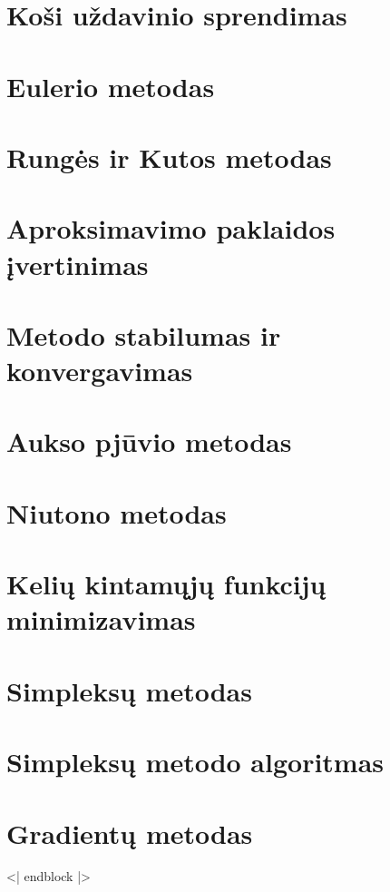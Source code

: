 \cite[9-42]{textbook-differential-equations}
\section{Koši uždavinio sprendimas}
\section{Eulerio metodas}
\section{Rungės ir Kutos metodas}
\section{Aproksimavimo paklaidos įvertinimas}
\section{Metodo stabilumas ir konvergavimas}

\cite[211-213]{textbook}
\section{Aukso pjūvio metodas}
\cite[213-215]{textbook}
\section{Niutono metodas}
\cite[217]{textbook}
\section{Kelių kintamųjų funkcijų minimizavimas}
\cite[220-221]{textbook}
\section{Simpleksų metodas}
\cite[222-224]{textbook}
\section{Simpleksų metodo algoritmas}
\cite[225]{textbook}
\section{Gradientų metodas}

<| endblock |>
